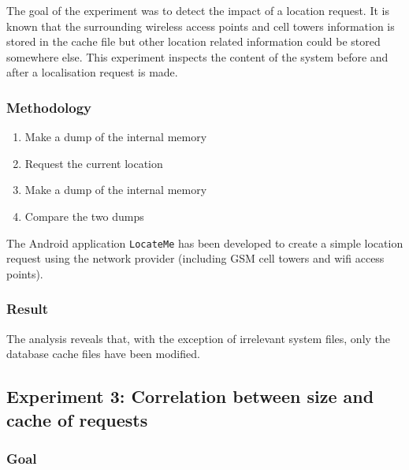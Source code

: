 The goal of the experiment was to detect the impact of a location request.
It is known that the surrounding wireless access points and cell towers information is stored in the cache file but other location related information could be stored somewhere else.
This experiment inspects the content of the system before and after a localisation request is made.


\subsubsection{Methodology}

\begin{enumerate}
\item Make a dump of the internal memory
\item Request the current location
\item Make a dump of the internal memory
\item Compare the two dumps
\end{enumerate}

The Android application \texttt{LocateMe} has been developed to create a simple location request using the network provider (including GSM cell towers and wifi access points).

\subsubsection{Result}

The analysis reveals that, with the exception of irrelevant system files, only the database cache files have been modified.\\

\subsection{Experiment 3: Correlation between size and cache of requests}

\subsubsection{Goal}

